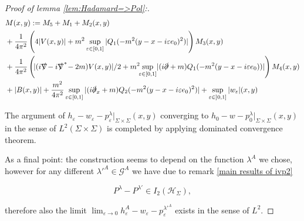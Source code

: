 \documentclass[a4paper,11pt]{article}
\begin{document}
\begin{proof}[Proof of lemma \ref{lem:Hadamard=>Pol}:]
\begin{align*}
&M(x,y):=M_5+M_1
+M_2(x,y)\\
&+\frac{1}{4\pi^2}\left(4 | V(x,y)| + m^2 \sup_{\varepsilon \in [0,1]}|Q_1(-m^2(y-x-i\varepsilon e_0)^2)|\right)M_3(x,y)\\
&+ \frac{1}{4\pi^2}\left(\!|(i\slashed{\nabla}\!-i\slashed{\nabla}^*\!-2m)V(x,y)|/2+m^2\!\! \sup_{\varepsilon \in [0,1]}
 \!|(i\slashed{\partial}+m)Q_1(-m^2(y-x-i\varepsilon e_0))| \right)M_4(x,y)\\
&+|B(x,y)|+\frac{m^2}{4\pi^2}\sup_{\varepsilon\in[0,1]} |(i\slashed{\partial}_x+m)Q_2(-m^2(y-x-i\varepsilon e_0)^2)| + \sup_{\varepsilon \in ]0,1]}|w_\varepsilon|(x,y)
\end{align*}

The argument of \(h_\varepsilon-w_\varepsilon-p^\lambda_{\varepsilon}|_{\Sigma\times \Sigma}(x,y)\) 
converging to \(h_0-w-p^\lambda_{0}|_{\Sigma\times \Sigma}(x,y)\) in the sense of \(L^2(\Sigma\times\Sigma)\)
is completed by applying dominated convergence theorem. 

As a final point: the construction seems to depend on the function \(\lambda^A\) we chose, however for any different \({\lambda'}^A\in \mathcal{G}^A\) 
we have due to remark \ref{main results of ivp2}

\begin{equation}
P^{\lambda}-P^{\lambda'}\in I_2(\mathcal{H}_\Sigma ),
\end{equation}

therefore also the limit \(\lim_{\varepsilon\rightarrow 0} h_\varepsilon^A - w_\varepsilon - p_\varepsilon^{{\lambda'}^A}\) exists in the sense of \(L^2\).




\end{proof}
\end{document}
